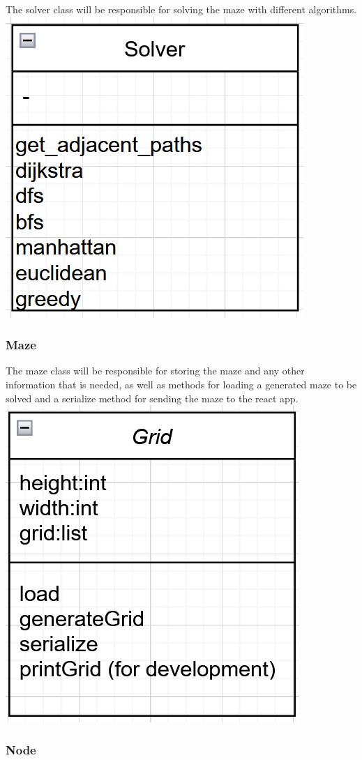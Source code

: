 \documentclass[titlepage]{article}
\begin{document}
The solver class will be responsible for solving the maze with different algorithms.
\newline
\includegraphics[width=0.5\linewidth]{assets/class diagrams/solver.PNG}

\subsubsection{Maze}

The maze class will be responsible for storing the maze and any other information that is needed, as well as methods for loading a generated maze to be solved and a serialize method for sending the maze to the react app.
\newline
\includegraphics[width=0.5\linewidth]{assets/class diagrams/maze.PNG}

\subsubsection{Node}
\end{document}
